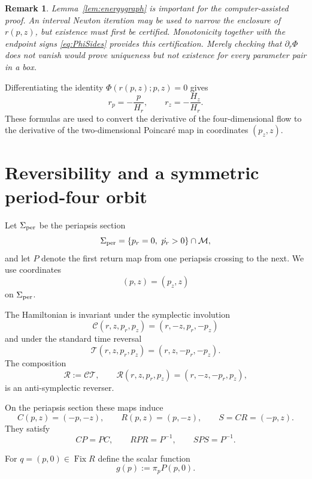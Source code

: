 \documentclass[11pt]{article}
\newtheorem{remark}[theorem]{Remark}
\newcommand{\cM}{\mathcal M}
\newcommand{\cR}{\mathcal R}
\newcommand{\Fix}{\operatorname{Fix}}
\newcommand{\pr}{p_r}
\newcommand{\pz}{p_z}
\begin{document}
\begin{remark}\label{rem:newton}
Lemma~\ref{lem:energygraph} is important for the computer-assisted proof.
An interval Newton iteration may be used to \emph{narrow} the enclosure of
$r(p,z)$, but existence must first be certified.  Monotonicity together with
the endpoint signs \eqref{eq:PhiSides} provides this certification.  Merely
checking that $\partial_r\Phi$ does not vanish would prove uniqueness but not
existence for every parameter pair in a box.
\end{remark}

Differentiating the identity $\Phi(r(p,z);p,z)=0$ gives
\begin{equation}\label{eq:liftderivatives}
 r_p=-\frac{p}{H_r},
 \qquad
 r_z=-\frac{H_z}{H_r}.
\end{equation}
These formulas are used to convert the derivative of the four-dimensional
flow to the derivative of the two-dimensional Poincar\'e map in coordinates
$(\pz,z)$.

\section{Reversibility and a symmetric period-four orbit}\label{sec:symmetry}

Let $\Sigma_{\rm per}$ be the periapsis section
\[
 \Sigma_{\rm per}
 =
 \{\pr=0,\ \dot{\pr}>0\}\cap\cM,
\]
and let $P$ denote the first return map from one periapsis crossing to the
next.  We use coordinates
\[
 (p,z)=(\pz,z)
\]
on $\Sigma_{\rm per}$.

The Hamiltonian is invariant under the symplectic involution
\[
 \mathcal C(r,z,\pr,\pz)
 =
 (r,-z,\pr,-\pz)
\]
and under the standard time reversal
\[
 \mathcal T(r,z,\pr,\pz)
 =
 (r,z,-\pr,-\pz).
\]
The composition
\begin{equation}\label{eq:fullreverser}
 \cR:=\mathcal C\mathcal T,\qquad
 \cR(r,z,\pr,\pz)=(r,-z,-\pr,\pz),
\end{equation}
is an anti-symplectic reverser.

On the periapsis section these maps induce
\[
 C(p,z)=(-p,-z),\qquad
 R(p,z)=(p,-z),\qquad
 S=CR=(-p,z).
\]
They satisfy
\begin{equation}\label{eq:reversibility}
 CP=PC,\qquad
 RPR=P^{-1},\qquad
 SPS=P^{-1}.
\end{equation}

For $q=(p,0)\in\Fix R$ define the scalar function
\begin{equation}\label{eq:g}
 g(p):=\pi_p P(p,0).
\end{equation}
\end{document}
